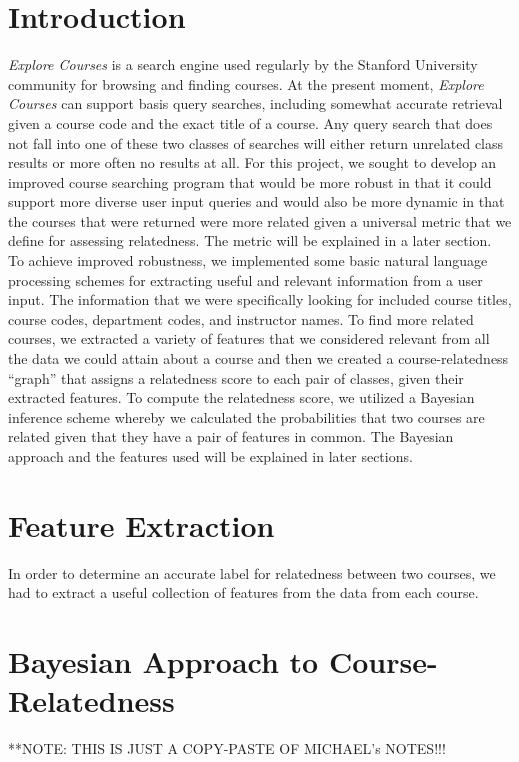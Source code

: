 \documentclass[12pt]{article}
\begin{document}
\section*{Introduction}
	\emph{Explore Courses} is a search engine used regularly by the Stanford University community for browsing and finding courses. At the present moment, \emph{Explore Courses} can support basis query searches, including somewhat accurate retrieval given a course code and the exact title of a course. Any query search that does not fall into one of these two classes of searches will either return unrelated class results or more often no results at all. For this project, we sought to develop an improved course searching program that would be more robust in that it could support more diverse user input queries and would also be more dynamic in that the courses that were returned were more related given a universal metric that we define for assessing relatedness. The metric will be explained in a later section. \\
	To achieve improved robustness, we implemented some basic natural language processing schemes for extracting useful and relevant information from a user input. The information that we were specifically looking for included course titles, course codes, department codes, and instructor names. To find more related courses, we extracted a variety of features that we considered relevant from all the data we could attain about a course and then we created a course-relatedness ``graph'' that assigns a relatedness score to each pair of classes, given their extracted features. To compute the relatedness score, we utilized a Bayesian inference scheme whereby we calculated the probabilities that two courses are related given that they have a pair of features in common. The Bayesian approach and the features used will be explained in later sections.

\section*{Feature Extraction}
	In order to determine an accurate label for relatedness between two courses, we had to extract a useful collection of features from the data from each course. 


\section*{Bayesian Approach to Course-Relatedness}
**NOTE: THIS IS JUST A COPY-PASTE OF MICHAEL's NOTES!!!\\
\end{document}

